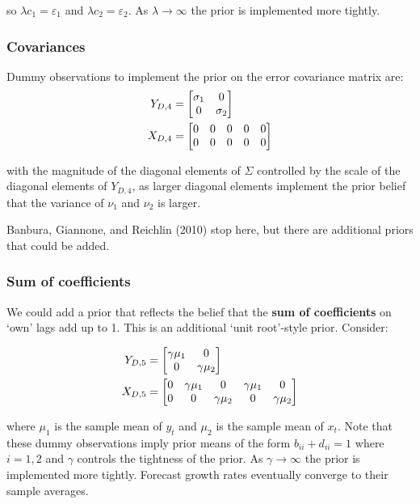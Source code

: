 \documentclass[
  letterpaper,
]{book}
\begin{document}
so \(\lambda c_1 = \varepsilon_1\) and \(\lambda c_2 = \varepsilon_2\).
As \(\lambda \rightarrow \infty\) the prior is implemented more tightly.

\hypertarget{covariances-1}{%
\subsubsection{Covariances}\label{covariances-1}}

Dummy observations to implement the prior on the error covariance matrix
are: \begin{align*}
  Y_{D,4} &= \left[\begin{matrix}\sigma_1 & 0 \cr 0 & \sigma_2\end{matrix}\right] \\
  X_{D,4} &= \left[\begin{matrix}0 & 0 & 0 & 0 & 0 \cr
    0 & 0 & 0 & 0 & 0 \end{matrix}\right]
\end{align*}

with the magnitude of the diagonal elements of \(\Sigma\) controlled by
the scale of the diagonal elements of \(Y_{D,4}\), as larger diagonal
elements implement the prior belief that the variance of \(\nu_1\) and
\(\nu_2\) is larger.

Banbura, Giannone, and Reichlin (2010) stop here, but there are
additional priors that could be added.

\hypertarget{sum-of-coefficients}{%
\subsubsection{Sum of coefficients}\label{sum-of-coefficients}}

We could add a prior that reflects the belief that the \textbf{sum of
coefficients} on `own' lags add up to 1. This is an additional `unit
root'-style prior. Consider:

\begin{align*}
  Y_{D,5} &= \left[\begin{matrix} \gamma\mu_1 & 0\cr 0 & \gamma\mu_2\end{matrix}\right] \\
  X_{D,5} &= \left [ \begin{matrix} 0 & \gamma\mu_1 & 0 & \gamma\mu_1 & 0\cr
    0 & 0 & \gamma\mu_2 & 0 & \gamma\mu_2\end{matrix}\right]
\end{align*}

where \(\mu_1\) is the sample mean of \(y_t\) and \(\mu_2\) is the
sample mean of \(x_t\). Note that these dummy observations imply prior
means of the form \(b_{ii} + d_{ii} = 1\) where \(i = 1, 2\) and
\(\gamma\) controls the tightness of the prior. As
\(\gamma \rightarrow \infty\) the prior is implemented more tightly.
Forecast growth rates eventually converge to their sample averages.
\end{document}
